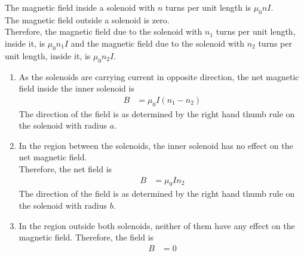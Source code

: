 \documentclass[fleqn, a4paper, 11pt, oneside]{amsart}
\theoremstyle{definition}
\theoremstyle{theorem}
\begin{document}
\begin{solution}
	The magnetic field inside a solenoid with $n$ turns per unit length is $\mu_0 n I$.\\
	The magnetic field outside a solenoid is zero.\\
	Therefore, the magnetic field due to the solenoid with $n_1$ turns per unit length, inside it, is $\mu_0 n_1 I$ and the magnetic field due to the solenoid with $n_2$ turns per unit length, inside it, is $\mu_0 n_2 I$.\\
	\begin{enumerate}[leftmargin = *]
		\item
			As the solenoids are carrying current in opposite direction, the net magnetic field inside the inner solenoid is
			\begin{align*}
				B & = \mu_0 I (n_1 - n_2)
			\end{align*}
			The direction of the field is as determined by the right hand thumb rule on the solenoid with radius $a$.
		\item
			In the region between the solenoids, the inner solenoid has no effect on the net magnetic field.\\
			Therefore, the net field is
			\begin{align*}
				B & = \mu_0 I n_2
			\end{align*}
			The direction of the field is as determined by the right hand thumb rule on the solenoid with radius $b$.
		\item
			In the region outside both solenoids, neither of them have any effect on the magnetic field.
			Therefore, the field is
			\begin{align*}
				B & = 0
			\end{align*}
	\end{enumerate}
\end{solution}
\end{document}
